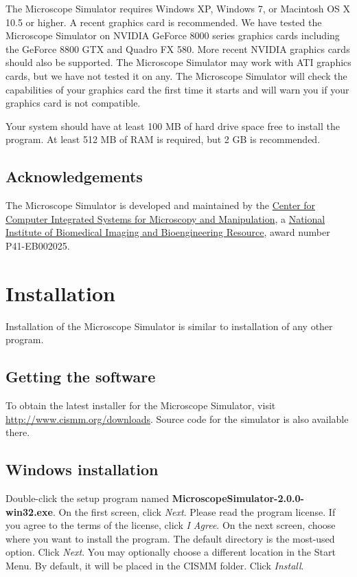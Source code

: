 \documentclass[11pt]{article}
\begin{document}
The Microscope Simulator requires Windows XP, Windows 7, or Macintosh OS X 10.5 or higher. A recent graphics card is recommended. We have tested the Microscope Simulator on NVIDIA GeForce 8000 series graphics cards including the GeForce 8800 GTX and Quadro FX 580. More recent NVIDIA graphics cards should also be supported. The Microscope Simulator may work with ATI graphics cards, but we have not tested it on any. The Microscope Simulator will check the capabilities of your graphics card the first time it starts and will warn you if your graphics card is not compatible.

Your system should have at least 100 MB of hard drive space free to install the program. At least 512 MB of RAM is required, but 2 GB is recommended.

\subsection{Acknowledgements}

The Microscope Simulator is developed and maintained by the \href{http://www.cismm.org}{Center for Computer Integrated Systems for Microscopy and Manipulation}, a \href{http://www.nibib.nih.gov/}{National Institute of Biomedical Imaging and Bioengineering Resource}, award number P41-EB002025.

\section{Installation}

Installation of the Microscope Simulator is similar to installation of any other program.

\subsection{Getting the software}

To obtain the latest installer for the Microscope Simulator, visit \url{http://www.cismm.org/downloads}. Source code for the simulator is also available there.

\subsection{Windows installation}

Double-click the setup program named \textbf{MicroscopeSimulator-2.0.0-win32.exe}. On the first screen, click \emph{Next}. Please read the program license. If you agree to the terms of the license, click \emph{I Agree}. On the next screen, choose where you want to install the program. The default directory is the most-used option. Click \emph{Next}. You may optionally choose a different location in the Start Menu. By default, it will be placed in the CISMM folder. Click \emph{Install}.
\end{document}
